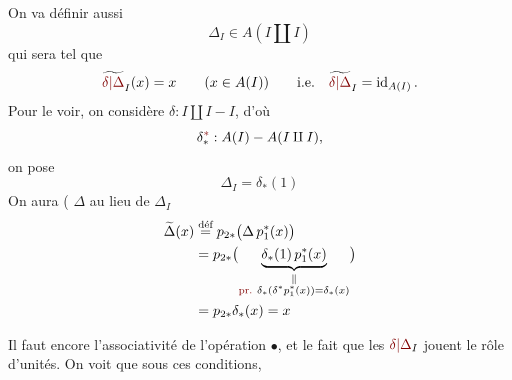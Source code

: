 
On va définir aussi
\[
\Delta_I\in A(I\amalg I)
\]
qui sera tel que
\[
\widetilde{\unsure{\delta|\Delta}}_I(x)=x\qquad(x\in A(I))
\qquad\text{i.e.}\quad\widetilde{\unsure{\delta|\Delta}}_I=\operatorname{id}_{A(I)}.
\]
Pour le voir, on  considère $\delta:I\amalg I-I$, d'où
\[
\delta^{\deleted{\unsure{*}}}_*:A(I)-A(I\amalg I),
\]
on pose
\[
\Delta_I=\delta_*(1)
\]
On aura ( $\Delta$ au lieu de $\Delta_I$
\[
\begin{aligned}
\widetilde\Delta(x)&\overset{\text{déf}}{=}p_{2*}\bigl(\Delta\,p_1^*(x)\bigr)\\
&=p_{2*}\bigl(\underbrace{\delta_*(1)\,p_1^*(x)}
_{\substack{\Vert\\ \unsure{\text{pr.}}\ \delta_*(\delta^*p_1^*(x))=\delta_*(x)}}\bigr)\\
&=p_{2*}\delta_*(x)=x
\end{aligned}
\]

Il faut encore  l'associativité de l'opération $\bullet$, et le fait que les $\unsure{\delta|\Delta}_I$ jouent le rôle d'unités. On voit que sous ces conditions,
